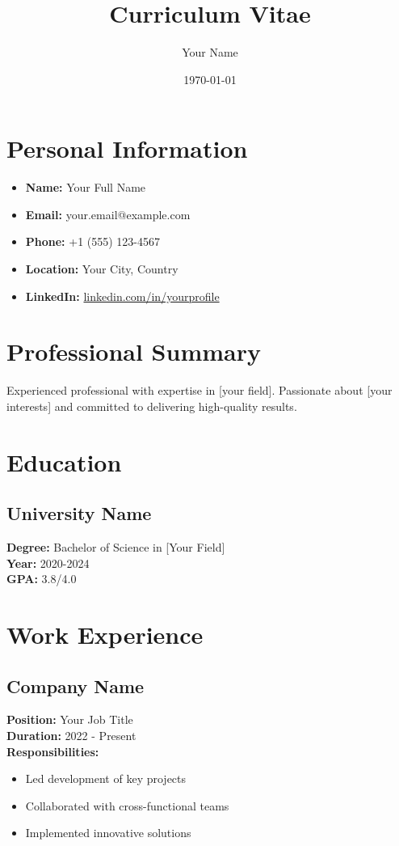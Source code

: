 \documentclass{article}
\title{Curriculum Vitae}
\author{Your Name}
\date{\today}
\begin{document}
\maketitle

\section{Personal Information}
\begin{itemize}
    \item \textbf{Name:} Your Full Name
    \item \textbf{Email:} your.email@example.com
    \item \textbf{Phone:} +1 (555) 123-4567
    \item \textbf{Location:} Your City, Country
    \item \textbf{LinkedIn:} \href{https://linkedin.com/in/yourprofile}{linkedin.com/in/yourprofile}
\end{itemize}

\section{Professional Summary}
Experienced professional with expertise in [your field]. Passionate about [your interests] and committed to delivering high-quality results.

\section{Education}
\subsection{University Name}
\textbf{Degree:} Bachelor of Science in [Your Field] \\
\textbf{Year:} 2020-2024 \\
\textbf{GPA:} 3.8/4.0

\section{Work Experience}
\subsection{Company Name}
\textbf{Position:} Your Job Title \\
\textbf{Duration:} 2022 - Present \\
\textbf{Responsibilities:}
\begin{itemize}
    \item Led development of key projects
    \item Collaborated with cross-functional teams
    \item Implemented innovative solutions
\end{itemize}
\end{document}
